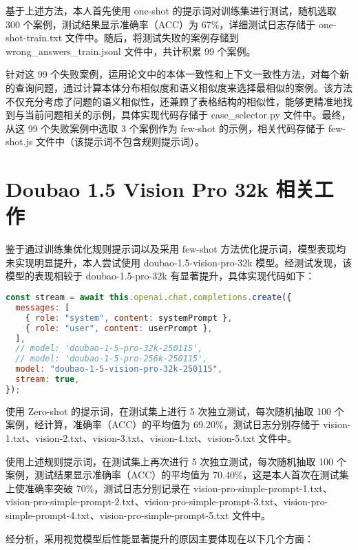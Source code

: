 \documentclass[12pt,a4paper]{ctexart}
\begin{document}
基于上述方法，本人首先使用 one-shot 的提示词对训练集进行测试，随机选取 300 个案例，测试结果显示准确率（ACC）为 67\%，详细测试日志存储于 one-shot-train.txt 文件中。随后，将测试失败的案例存储到 wrong\_answers\_train.jsonl 文件中，共计积累 99 个案例。

针对这 99 个失败案例，运用论文中的本体一致性和上下文一致性方法，对每个新的查询问题，通过计算本体分布相似度和语义相似度来选择最相似的案例。该方法不仅充分考虑了问题的语义相似性，还兼顾了表格结构的相似性，能够更精准地找到与当前问题相关的示例，具体实现代码存储于 case\_selector.py 文件中。最终，从这 99 个失败案例中选取 3 个案例作为 few-shot 的示例，相关代码存储于 few-shot.js 文件中（该提示词不包含规则提示词）。

\section{Doubao 1.5 Vision Pro 32k 相关工作}
鉴于通过训练集优化规则提示词以及采用 few-shot 方法优化提示词，模型表现均未实现明显提升，本人尝试使用 doubao-1.5-vision-pro-32k 模型。经测试发现，该模型的表现相较于 doubao-1.5-pro-32k 有显著提升，具体实现代码如下：

\begin{lstlisting}[language=JavaScript]
const stream = await this.openai.chat.completions.create({
  messages: [
    { role: "system", content: systemPrompt },
    { role: "user", content: userPrompt },
  ],
  // model: 'doubao-1-5-pro-32k-250115',
  // model: 'doubao-1-5-pro-256k-250115',
  model: "doubao-1-5-vision-pro-32k-250115",
  stream: true,
});
\end{lstlisting}

使用 Zero-shot 的提示词，在测试集上进行 5 次独立测试，每次随机抽取 100 个案例，经计算，准确率（ACC）的平均值为 69.20\%，测试日志分别存储于 vision-1.txt、vision-2.txt、vision-3.txt、vision-4.txt、vision-5.txt 文件中。

使用上述规则提示词，在测试集上再次进行 5 次独立测试，每次随机抽取 100 个案例，测试结果显示准确率（ACC）的平均值为 70.40\%，这是本人首次在测试集上使准确率突破 70\%，测试日志分别记录在 vision-pro-simple-prompt-1.txt、vision-pro-simple-prompt-2.txt、vision-pro-simple-prompt-3.txt、vision-pro-simple-prompt-4.txt、vision-pro-simple-prompt-5.txt 文件中。

经分析，采用视觉模型后性能显著提升的原因主要体现在以下几个方面：
\end{document}
